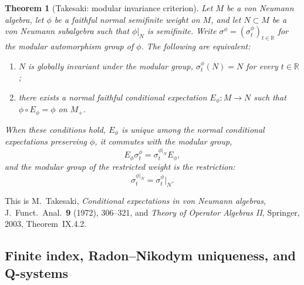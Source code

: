 \documentclass[11pt]{article}
\newtheorem{theorem}{Theorem}[section]
\theoremstyle{remark}
\newcommand{\R}{\mathbb R}
\begin{document}
\begin{theorem}[Takesaki: modular invariance criterion]
\label{thm:takesaki}
Let $M$ be a von Neumann algebra, let $\phi$ be a faithful normal
semifinite weight on $M$, and let $N\subset M$ be a von Neumann
subalgebra such that $\phi|_N$ is semifinite.  Write
$\sigma^\phi=(\sigma_t^\phi)_{t\in\R}$ for the modular automorphism
group of $\phi$.  The following are equivalent:
\begin{enumerate}[label=\textup{(\roman*)}]
\item $N$ is globally invariant under the modular group,
  $\sigma_t^\phi(N)=N$ for every $t\in\R$;
\item there exists a normal faithful conditional expectation
  $E_\phi:M\to N$ such that
  $\phi\circ E_\phi=\phi$ on $M_+$.
\end{enumerate}
When these conditions hold, $E_\phi$ is unique among the normal
conditional expectations preserving $\phi$, it commutes with the
modular group,
\[
 E_\phi\sigma_t^\phi=\sigma_t^{\phi|_N}E_\phi,
\tag{2.2}\label{eq:takesaki-intertwine}
\]
and the modular group of the restricted weight is the restriction:
\[
 \sigma_t^{\phi|_N}=\sigma_t^\phi|_N.
\tag{2.3}\label{eq:mod-restrict}
\]
\end{theorem}

This is M.~Takesaki, \emph{Conditional expectations in von Neumann
algebras}, J.\ Funct.\ Anal.\ \textbf{9} (1972), 306--321, and
\emph{Theory of Operator Algebras II}, Springer, 2003,
Theorem~IX.4.2.

\subsection{Finite index, Radon--Nikodym uniqueness, and Q-systems}
\end{document}
